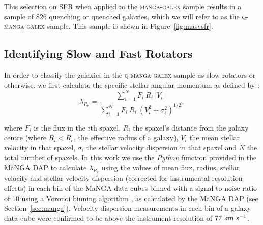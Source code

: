 \documentclass[useAMS,usenatbib]{mn2e}
\begin{document}
This selection on SFR when applied to the \textsc{manga-galex} sample results in a sample of $826$ quenching or quenched galaxies, which we will refer to as the \textsc{q-manga-galex} sample. This sample is shown in Figure~\ref{fig:masvsfr}.


\subsection{Identifying Slow and Fast Rotators}\label{sec:fvs}

In order to classify the galaxies in the \textsc{q-manga-galex} sample as slow rotators or otherwise, we first calculate the specific stellar angular momentum as defined by \cite{emsellem07, emsellem11};
\begin{equation}
\lambda_{R_{e}} = \frac{\sum_{i=1}^{N} F_i\ R_i\ |V_i|}{\sum_{i=1}^{N} F_i\ R_i\ (V_i^2 + \sigma_i^2)^{1/2}},
\end{equation}	

where $F_i$ is the flux in the $i$th spaxel, $R_i$ the spaxel's distance from the galaxy centre (where $R_i < R_e$, the effective radius of a galaxy), $V_i$ the mean stellar velocity in that spaxel, $\sigma_i$ the stellar velocity dispersion in that spaxel and $N$ the total number of spaxels. In this work we use the \emph{Python} function provided in the MaNGA DAP to calculate $\lambda_{R_{e}}$ using the values of mean flux, radius, stellar velocity and stellar velocity dispersion (corrected for instrumental resolution effects) in each bin of the MaNGA data cubes binned with a signal-to-noise ratio of 10 using a Voronoi binning algorithm \citep{cappellari03}, as calculated by the MaNGA DAP (see Section~\ref{sec:manga}). Velocity dispersion measurements in each bin of a galaxy data cube were confirmed to be above the instrument resolution of $77~\rm{km}~\rm{s}^{-1}$.
\end{document}
